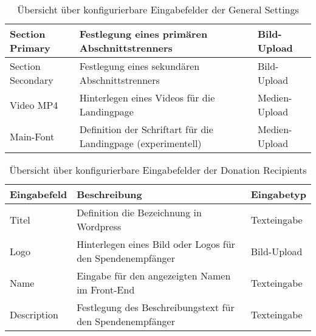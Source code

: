 \documentclass[
	ngerman,
	BCOR=8mm,
	headings=normal,
	parskip=half,
	headsepline,
	automark,
	listof=totoc,
	bibliography=totoc,
]{scrreprt}
\begin{document}
\begin{table}[h]
\begin{tabular}{|p{3cm}|p{6cm}|p{5cm}|}
        \hline
        Section Primary & Festlegung eines primären Abschnittstrenners & Bild-Upload \\
        \hline
        Section Secondary & Festlegung eines sekundären Abschnittstrenners & Bild-Upload \\
        \hline
        Video MP4 & Hinterlegen eines Videos für die Landingpage & Medien-Upload \\
        \hline
        Main-Font & Definition der Schriftart für die Landingpage (experimentell) & Medien-Upload \\
        \hline
    \end{tabular}
    \caption{Übersicht über konfigurierbare Eingabefelder der General Settings}
    \label{tab:eingabefelder_general_settings}
\end{table}

\begin{table}[h]
    \centering
    \renewcommand{\arraystretch}{1.3}
    \begin{tabular}{|p{3cm}|p{6cm}|p{5cm}|}
        \hline
        \textbf{Eingabefeld} & \textbf{Beschreibung} & \textbf{Eingabetyp} \\
        \hline
        Titel & Definition die Bezeichnung in Wordpress & Texteingabe \\
        \hline
        Logo & Hinterlegen eines Bild oder Logos für den Spendenempfänger & Bild-Upload \\
        \hline
        Name & Eingabe für den angezeigten Namen im Front-End & Texteingabe \\
        \hline
        Description & Festlegung des Beschreibungstext für den Spendenempfänger  & Texteingabe \\
        \hline
    \end{tabular}
    \caption{Übersicht über konfigurierbare Eingabefelder der Donation Recipients}
    \label{tab:eingabefelder_donation_recipients}
\end{table}


%

%
%
\end{document}
